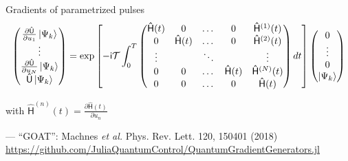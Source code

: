 \documentclass[compress, aspectratio=169,usepdftitle=false]{beamer}
\newcommand{\Op}[1]{\ensuremath{\mathsf{\hat{#1}}}}
\newcommand{\ii}{\mathsf{i}}
\newcommand{\TimeOrder}{\mathcal{T}}
\begin{document}
\begin{frame}{Gradients of parametrized pulses}
    \begin{equation*}%
      \begin{pmatrix}
        \frac{\partial \Op{U}}{\partial u_1} \ket{\Psi_k} \\
          \vdots\\
          \frac{\partial \Op{U}}{\partial u_N} \ket{\Psi_k} \\
          \Op{U} \ket{\Psi_k}
        \end{pmatrix}
      = \exp \left[-\ii \TimeOrder \int_0^T \begin{pmatrix}
        \Op{H}(t) & 0 & \dots & 0 &\Op{H}^{(1)}(t) \\
        0 & \Op{H}(t) & \dots & 0 & \Op{H}^{(2)}(t) \\
        \vdots & & \ddots & & \vdots \\
        0 & 0 & \dots & \Op{H}(t) & \Op{H}^{(N)}(t) \\
        0 & 0 & \dots & 0 & \Op{H}(t)
      \end{pmatrix} dt\right]
      \begin{pmatrix} 0 \\ \vdots \\ 0 \\ \ket{\Psi_k} \end{pmatrix}
    \end{equation*}
    \par
    \vspace{5mm}
    \hspace{1cm}
    with $\Op{H}^{(n)}(t) = \frac{\partial \Op{H}(t)}{\partial u_n}$
    \par
    \vspace{5mm}
    {\footnotesize
      \hfill --- ``GOAT'': Machnes \textit{et al.}  Phys. Rev. Lett. 120, 150401 (2018)
    }
    \hfill \footnotesize{\url{https://github.com/JuliaQuantumControl/QuantumGradientGenerators.jl}}

\end{frame}
\end{document}

